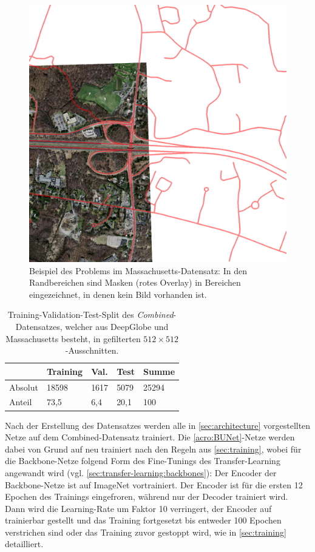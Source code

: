 \begin{figure}
	\centering
	\includegraphics[width=.5\textwidth]{Bilder/problem_mass.png} 
	\caption{Beispiel des Problems im Massachusetts-Datensatz: In den Randbereichen sind Masken (rotes Overlay) in Bereichen eingezeichnet, 
	in denen kein Bild vorhanden ist.}
	\label{fig:problem-mass}
\end{figure} 

\begin{table}[ht]
	\centering
	\begin{tabular}{l|l|l|l|l}
		& Training & Val. & Test & Summe \\
		\midrule
		Absolut & 18598 & 1617 & 5079 & 25294 \\
		Anteil & 73,5 & 6,4 & 20,1 & 100 \\ 
	\end{tabular}
	\caption{Training-Validation-Test-Split des \textit{Combined}-Datensatzes, welcher aus DeepGlobe und Massachusetts besteht, 
	in gefilterten $512{\times}512$-Ausschnitten.}
	\label{tab:combined-split}
\end{table}

Nach der Erstellung des Datensatzes werden alle in \autoref{sec:architecture} vorgestellten Netze
auf dem Combined-Datensatz trainiert. 
Die \autoref{acro:BUNet}-Netze werden dabei von Grund auf neu trainiert nach den Regeln aus \autoref{sec:training}, 
wobei für die Backbone-Netze folgend Form des Fine-Tunings des Transfer-Learning angewandt wird (vgl. \autoref{sec:transfer-learning:backbones}): 
Der Encoder der Backbone-Netze ist auf ImageNet vortrainiert. Der Encoder ist für die ersten 12 Epochen des Trainings eingefroren, 
während nur der Decoder trainiert wird. Dann  wird die Learning-Rate um Faktor 10 verringert, der Encoder 
auf trainierbar gestellt und das Training fortgesetzt bis entweder 100 Epochen verstrichen sind oder das Training 
zuvor gestoppt wird, wie in \autoref{sec:training} detailliert.    


